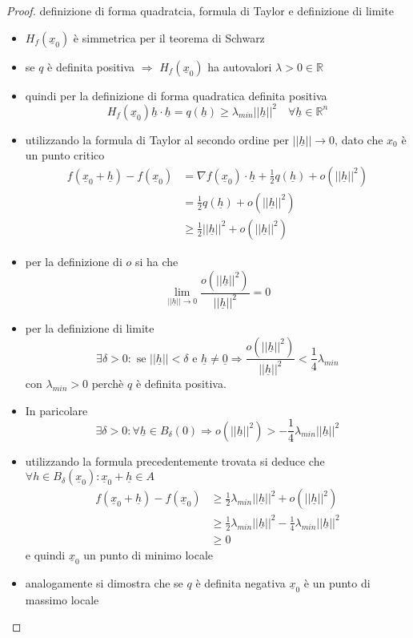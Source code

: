 \documentclass[12pt, a4paper]{article}
\theoremstyle{break}
\begin{document}
\begin{proof} definizione di forma quadratcia, formula di Taylor e definizione
	di limite
	\begin{itemize}
		\item $H_f(\underline{x}_0)$ è simmetrica per il teorema di Schwarz
		\item se $q$ è definita positiva $\Rightarrow$ $H_f(\underline{x}_0)$ ha
			autovalori $\lambda > 0 \in \mathbb{R}$
		\item quindi per la definizione di forma quadratica definita positiva
			\[
				H_f(\underline{x}_0) \underline{h} \cdot \underline{h} = q
				(\underline{h}) \geq \lambda_{min} ||\underline{h}||^2
				\quad \forall \underline{h} \in \mathbb{R}^n
			\]
		\item utilizzando la formula di Taylor al secondo ordine per
			$||\underline{h}|| \to 0$, dato che $x_0$ è un punto critico
			\begin{align*}
				f(\underline{x}_0 + \underline{h}) - f(\underline{x}_0) & =
				\nabla f(\underline{x}_0) \cdot \underline{h} + \frac{1}{2}
				q(\underline{h}) + o(||\underline{h}||^2)
				\\ & = \frac{1}{2} q(\underline{h})+ o(||\underline{h}||^2)
				\\ & \geq \frac{1}{2}  ||\underline{h}||^2 +
				o(||\underline{h}||^2)
			\end{align*}
		\item per la definizione di $o$ si ha che
			\[
				\lim_{||\underline{h}|| \to 0} \frac{o(||\underline{h}||^2)}
				{||\underline{h}||^2} = 0
			\]
		\item per la definizione di limite
			\[
				\exists \delta > 0 : \text{ se } ||\underline{h}|| < \delta
				\text{ e } \underline{h} \neq \underline{0} \Rightarrow
				\frac{o(||\underline{h}||^2)} {||\underline{h}||^2} <
				\frac{1}{4}\lambda_{min}
			\]
			con $\lambda_{min} > 0$ perchè $q$ è definita positiva.\\
		\item In paricolare
			\[
				\exists \delta > 0 : \forall \underline{h} \in B_{\delta}(0)
				\Rightarrow o(||\underline{h}||^2) > -\frac{1}{4}\lambda_{min}
				||\underline{h}||^2
			\]
		\item utilizzando la formula precedentemente trovata si deduce che
			$\forall h \in B_{\delta}(\underline{x}_0): \underline{x}_0 +
				\underline{h} \in A$
			\begin{align*}
				f(\underline{x}_0 + \underline{h}) - f(\underline{x}_0) & \geq
				\frac{1}{2} \lambda_{min} ||\underline{h}||^2 + o(||\underline{h}||^2)
				\\ & \geq \frac{1}{2}  \lambda_{min} ||\underline{h}||^2 -
				\frac{1}{4} \lambda_{min} ||\underline{h}||^2
				\\ & \geq 0
			\end{align*}
			e quindi $\underline{x}_0 $ un punto di minimo locale
		\item analogamente si dimostra che se $q$ è definita negativa
			$\underline{x}_0$ è un punto di massimo locale
	\end{itemize}
\end{proof}
\end{document}
